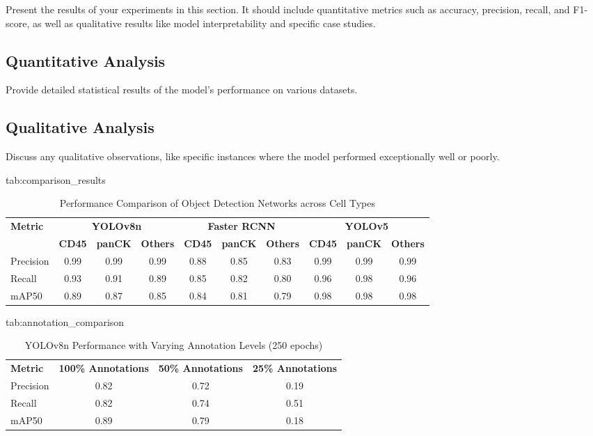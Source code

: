 \documentclass[anon]{midl} %
\begin{document}
Present the results of your experiments in this section. It should include quantitative metrics such as accuracy, precision, recall, and F1-score, as well as qualitative results like model interpretability and specific case studies.

\subsection{Quantitative Analysis}
Provide detailed statistical results of the model's performance on various datasets.

\subsection{Qualitative Analysis}
Discuss any qualitative observations, like specific instances where the model performed exceptionally well or poorly.


\begin{table}[htbp]
\floatconts
  {tab:comparison_results}%
  {\caption{Performance Comparison of Object Detection Networks across Cell Types}}%
  {\begin{tabular}{l|ccc|ccc|ccc}
  \bfseries Metric & \multicolumn{3}{c|}{\bfseries YOLOv8n} & \multicolumn{3}{c|}{\bfseries Faster RCNN} & \multicolumn{3}{c}{\bfseries YOLOv5}\\
  & {\small \bfseries CD45} & {\small \bfseries panCK} & {\small \bfseries Others} & {\small \bfseries CD45} & {\small \bfseries panCK} & {\small \bfseries Others} & {\small \bfseries CD45} & {\small \bfseries panCK} & {\small \bfseries Others}\\
  Precision & 0.99 & 0.99 & 0.99 & 0.88 & 0.85 & 0.83 & 0.99 & 0.99 & 0.99\\
  Recall & 0.93 & 0.91 & 0.89 & 0.85 & 0.82 & 0.80 & 0.96 & 0.98 & 0.96\\
  mAP50 & 0.89 & 0.87 & 0.85 & 0.84 & 0.81 & 0.79 & 0.98 & 0.98 & 0.98
  \end{tabular}}
\end{table}


\begin{table}[htbp]
\floatconts
  {tab:annotation_comparison}%
  {\caption{YOLOv8n Performance with Varying Annotation Levels (250 epochs)}}%
  {\begin{tabular}{lccc}
  \bfseries Metric & \bfseries 100\% Annotations & \bfseries 50\% Annotations & \bfseries 25\% Annotations\\
  Precision & 0.82 & 0.72 & 0.19\\
  Recall & 0.82 & 0.74 & 0.51\\
  mAP50 & 0.89 & 0.79 & 0.18
  \end{tabular}}
\end{table}
\end{document}
